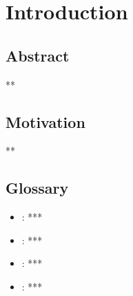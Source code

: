 
\chapter{Introduction}

\begin{comment}
TO DO.
\end{comment}
\section{Abstract}

**

\section{Motivation}

**

\section{Glossary}

\begin{itemize}

    \item {}: ***
    \item {}: ***
    \item {}: ***
    \item {}: ***

\end{itemize}




